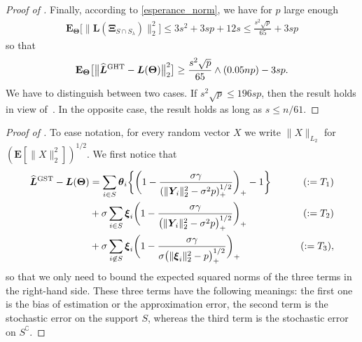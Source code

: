 \documentclass[sts,preprint,reqno,a4paper]{imsart}
\def\bxi{\boldsymbol\xi}
\def\bXi{\boldsymbol\Xi}
\def\bt{\boldsymbol\theta}
\def\bTheta{\boldsymbol\Theta}
\def\bY{\boldsymbol Y\!}
\def\bL{\boldsymbol L}
\def\bfT{\mathbf\Theta}
\def\esp{\mathbf E}
\def\hat{\widehat}
\theoremstyle{plain}
\theoremstyle{remark}
\theoremstyle{definition}
\begin{document}
\begin{proof}[Proof of ]
	Finally, according to \eqref{esperance_norm}, we have for $p$ large enough
	\begin{align}
		\esp_\bfT \big[\|\bL(\bXi_{S\cap S_\lambda})\|_2^2\big] \le 3s^2 + 3sp+12s
		\le \frac{s^2\sqrt{p}}{65} + 3sp
	\end{align}	
	so that
	\begin{equation}
	\esp_\bfT \big[\big\| \hat{\bL}{}^{\rm GHT}-\bL(\bfT) \big\|_2^2\big] 
	\ge \frac{s^2\sqrt{p}}{65}\wedge(0.05np) - 3sp.
	\end{equation}
	We have to distinguish between two cases. If $s^2\sqrt{p}\le 196sp$, then the result holds in view of~. In the opposite case, the result holds as long as $s\le n/61$.
\end{proof}

\begin{proof}[Proof of ] To ease notation, for every random vector
$X$ we write $\|X\|_{L_2}$ for $(\esp[\|X\|_2^2])^{1/2}$. We first notice that
	\begin{align}
	\hat{\bL}{}^{\rm GST}-\bL(\bTheta) &=  \sum_{i\in S} \bt_i \bigg\{\bigg(1-\frac{\sigma\gamma}
	{(\|\bY_i\|^2_2-\sigma^2p)_+^{1/2}}\bigg)_+-1\bigg\} \qquad &(:=T_1)\\
	&+ \sigma\sum_{i\in S} \bxi_i \bigg(1-\frac{\sigma\gamma}{\big(\|\bY_i\|^2_2-\sigma^2p\big)_+^{1/2}}\bigg)_+ \qquad &(:=T_2)\\
	&+ \sigma\sum_{i\not\in S} \bxi_i \bigg(1-\frac{\sigma\gamma}{\sigma\big(\|\bxi_i\|^2_2-p\big)_+^{1/2}}\bigg)_+\qquad &(:=T_3),
	\end{align}	
	so that we only need to bound the expected squared norms of the three terms in the right-hand side. These three terms have the following meanings: the first one is the bias of estimation
or the approximation error, the second term is the stochastic error on the support $S$,
whereas the third term is the stochastic error on $S^\complement$.
	

\end{proof}
\end{document}
